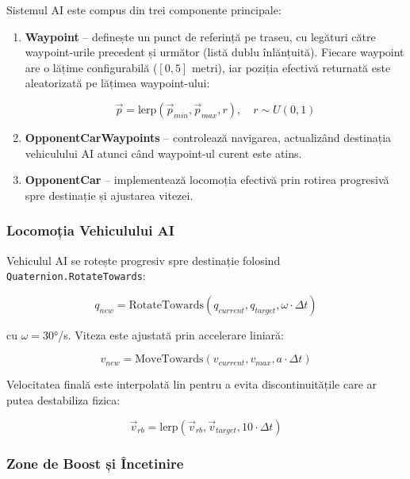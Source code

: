 \documentclass[11pt,twocolumn]{article}
\begin{document}
Sistemul AI este compus din trei componente principale:

\begin{enumerate}
    \item \textbf{Waypoint} -- definește un punct de referință pe traseu, cu legături către waypoint-urile precedent și următor (listă dublu înlănțuită). Fiecare waypoint are o lățime configurabilă ($[0, 5]$ metri), iar poziția efectivă returnată este aleatorizată pe lățimea waypoint-ului:

    \begin{equation}
        \vec{p} = \text{lerp}(\vec{p}_{min}, \vec{p}_{max}, r), \quad r \sim U(0, 1)
    \end{equation}

    \item \textbf{OpponentCarWaypoints} -- controlează navigarea, actualizând destinația vehiculului AI atunci când waypoint-ul curent este atins.

    \item \textbf{OpponentCar} -- implementează locomoția efectivă prin rotirea progresivă spre destinație și ajustarea vitezei.
\end{enumerate}

\subsubsection{Locomoția Vehiculului AI}

Vehiculul AI se rotește progresiv spre destinație folosind \texttt{Quaternion.RotateTowards}:

\begin{equation}
    q_{new} = \text{RotateTowards}(q_{current}, q_{target}, \omega \cdot \Delta t)
\end{equation}

cu $\omega = 30°$/s. Viteza este ajustată prin accelerare liniară:

\begin{equation}
    v_{new} = \text{MoveTowards}(v_{current}, v_{max}, a \cdot \Delta t)
\end{equation}

Velocitatea finală este interpolată lin pentru a evita discontinuitățile care ar putea destabiliza fizica:

\begin{equation}
    \vec{v}_{rb} = \text{lerp}(\vec{v}_{rb}, \vec{v}_{target}, 10 \cdot \Delta t)
\end{equation}

\subsubsection{Zone de Boost și Încetinire}
\end{document}
